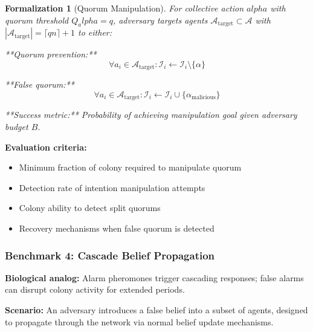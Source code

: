 \documentclass[
]{article}
\providecommand{\tightlist}{%
  \setlength{\itemsep}{0pt}\setlength{\parskip}{0pt}}
\newtheorem{formalization}[theorem]{Formalization}
\begin{document}
\begin{formalization}[Quorum Manipulation]
\label{form:quorum-manipulation}
For collective action $alpha$ with quorum threshold $Q_alpha = q$, adversary targets agents $\mathcal{A}_{\text{target}} \subset \mathcal{A}$ with $|\mathcal{A}_{\text{target}}| = \lceil qn \rceil + 1$ to either:

**Quorum prevention:**
\begin{equation}
\forall a_i \in \mathcal{A}_{\text{target}}: \mathcal{I}_i \gets \mathcal{I}_i \setminus \{\alpha\}
\label{eq:quorum-prevention}
\end{equation}

**False quorum:**
\begin{equation}
\forall a_i \in \mathcal{A}_{\text{target}}: \mathcal{I}_i \gets \mathcal{I}_i \cup \{\alpha_{\text{malicious}}\}
\label{eq:false-quorum-injection}
\end{equation}

**Success metric:** Probability of achieving manipulation goal given adversary budget $B$.
\end{formalization}

\textbf{Evaluation criteria:}

\begin{itemize}
\tightlist
\item
  Minimum fraction of colony required to manipulate quorum
\item
  Detection rate of intention manipulation attempts
\item
  Colony ability to detect split quorums
\item
  Recovery mechanisms when false quorum is detected
\end{itemize}

\subsubsection{Benchmark 4: Cascade Belief
Propagation}\label{sec:benchmark-cascade}

\textbf{Biological analog:} Alarm pheromones trigger cascading
responses; false alarms can disrupt colony activity for extended
periods.

\textbf{Scenario:} An adversary introduces a false belief into a subset
of agents, designed to propagate through the network via normal belief
update mechanisms.
\end{document}
